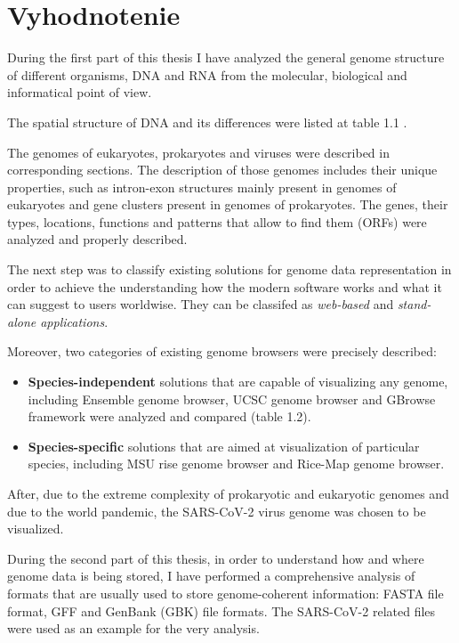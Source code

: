 
\chapter{Vyhodnotenie}

During the first part of this thesis I have analyzed the general genome structure of different organisms, DNA and RNA from the molecular, biological and informatical point of view.

The spatial structure of DNA and its differences were listed at table 1.1 .

The genomes of eukaryotes, prokaryotes and viruses were described in corresponding sections.
The description of those genomes includes their unique properties, such as intron-exon structures mainly present in genomes of eukaryotes and gene clusters present in genomes of prokaryotes.
The genes, their types, locations, functions and patterns that allow to find them (ORFs) were analyzed and properly described.

The next step was to classify existing solutions for genome data representation in order to achieve the understanding how the modern software works and what it can suggest to users worldwise.
They can be classifed as \textit{web-based} and \textit{stand-alone applications}.

Moreover, two categories of existing genome browsers were precisely described:
\begin{itemize}
    \item \textbf{Species-independent} solutions that are capable of visualizing any genome, including Ensemble genome browser, UCSC genome browser and GBrowse framework were analyzed and compared (table 1.2).
    \item \textbf{Species-specific} solutions that are aimed at visualization of particular species, including MSU rise genome browser and Rice-Map genome browser.
\end{itemize}

After, due to the extreme complexity of prokaryotic and eukaryotic genomes and due to the world pandemic, the SARS-CoV-2 virus genome was chosen to be visualized.

During the second part of this thesis, in order to understand how and where genome data is being stored, I have performed a comprehensive analysis of formats that are usually used to store genome-coherent information: FASTA file format, GFF and GenBank (GBK) file formats.
The SARS-CoV-2 related files were used as an example for the very analysis.

